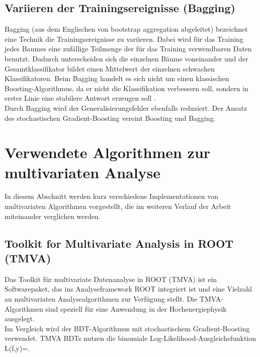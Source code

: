 \subsection{Variieren der Trainingsereignisse (Bagging)}
\label{ch:Algorithmen:subsec:Bagging}

Bagging (aus dem Englischen von bootstrap aggregation abgeleitet) bezeichnet eine Technik die Trainingsereignisse zu variieren. Dabei wird f\"ur das Training jedes Baumes eine zuf\"allige Teilmenge der f\"ur das Training verwendbaren Daten benutzt. Dadurch unterscheiden sich die einzelnen B\"aume voneinander und der Gesamtklassifikator bildet einen Mittelwert der einzelnen schwachen Klassifikatoren.
Beim Bagging handelt es sich nicht um einen klassischen Boosting-Algorithmus, da er nicht die Klassifikation verbessern soll, sondern in erster Linie eine stabilere Antwort erzeugen soll \cite{Hocker:2007ht}.\\
Durch Bagging wird der Generalisierungsfehler ebenfalls reduziert.
Der Ansatz des stochastischen Gradient-Boosting vereint Boosting und Bagging.


\section{Verwendete Algorithmen zur multivariaten Analyse}
\label{ch:Algorithmen:subsec:Implementationen}

In diesem Abschnitt werden kurz verschiedene Implementationen von multivariaten Algorithmen vorgestellt, die im weiteren Verlauf der Arbeit miteinander verglichen werden.

\subsection{Toolkit for Multivariate Analysis in ROOT (TMVA)}
\label{ch:Algorithmen:subsec:TMVA}

Das Toolkit f\"ur multivariate Datenanalyse in ROOT (TMVA) ist ein Softwarepaket, das ins Analyseframework ROOT integriert ist und eine Vielzahl an multivariaten Analysealgorithmen zur Verf\"ugung stellt. Die TMVA-Algorithmen sind speziell f\"ur eine Anwendung in der Hochenergiephysik ausgelegt.\\
Im Vergleich wird der BDT-Algorithmus mit stochastischem Gradient-Boosting verwendet. TMVA BDTs nutzen die binomiale Log-Likelihood-Ausgleichsfunktion
\beq
L(f,y)=.
\label{eq:tmva_loss}
\eeq


